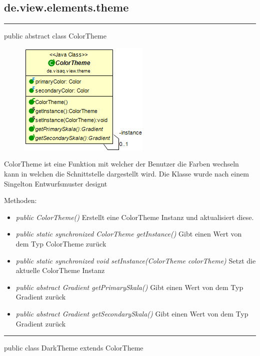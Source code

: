 \subsection{de.view.elements.theme}

\rule{\textwidth}{0.4pt} 
public abstract class ColorTheme

\begin{minipage}{0.3\textwidth}
    \begin{figure}[H]
        \includegraphics[scale = 0.5]{media/frontend/view/de.view.elements.theme/ColorTheme_Class.png}
    \end{figure}
    \end{minipage} \hfill
    \begin{minipage}{0.6\textwidth}
ColorTheme ist eine Funktion mit welcher der Benutzer die Farben wechseln kann in welchen die Schnittstelle dargestellt wird. Die Klasse wurde nach einem Singelton Entwurfsmuster designt
\end{minipage}

Methoden:
\begin{itemize} 
    \item \emph{public ColorTheme()} Erstellt eine ColorTheme Instanz und aktualisiert diese.
    \item \emph{public static synchronized ColorTheme getInstance()} Gibt einen Wert von dem Typ ColorTheme zurück
    \item \emph{public static synchronized void setInstance(ColorTheme colorTheme)} Setzt die aktuelle ColorTheme Instanz   
    \item \emph{public abstract Gradient getPrimarySkala()} Gibt einen Wert von dem Typ Gradient zurück
    \item \emph{public abstract Gradient getSecondarySkala()}  Gibt einen Wert von dem Typ Gradient zurück
\end{itemize}

\rule{\textwidth}{0.4pt} 
public class DarkTheme extends ColorTheme

